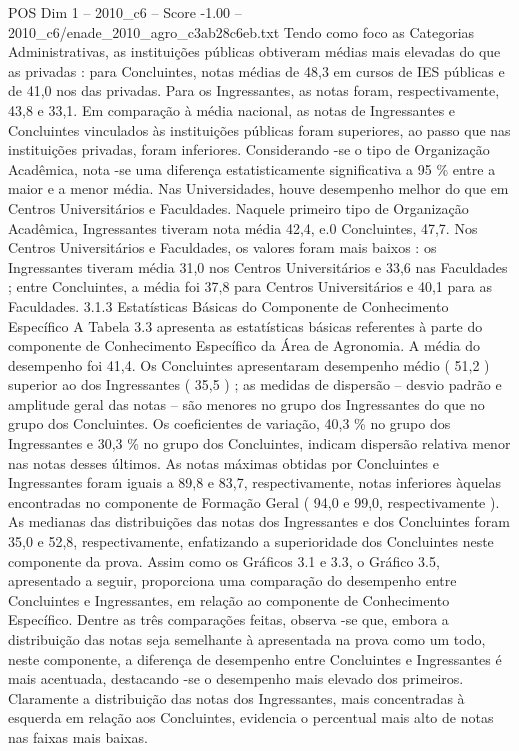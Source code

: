 \begin{textsample}{POS Dim 1 – 2010\_c6 – Score -1.00 – 2010\_c6/enade\_2010\_agro\_c3ab28c6eb.txt}
Tendo como foco as Categorias Administrativas, as instituições públicas obtiveram médias mais elevadas do que as privadas : para Concluintes, notas médias de 48,3 em cursos de IES públicas e de 41,0 nos das privadas.
Para os Ingressantes, as notas foram, respectivamente, 43,8 e 33,1.
Em comparação à média nacional, as notas de Ingressantes e Concluintes vinculados às instituições públicas foram superiores, ao passo que nas instituições privadas, foram inferiores.
Considerando -se o tipo de Organização Acadêmica, nota -se uma diferença estatisticamente significativa a 95 \% entre a maior e a menor média.
Nas Universidades, houve desempenho melhor do que em Centros Universitários e Faculdades.
Naquele primeiro tipo de Organização Acadêmica, Ingressantes tiveram nota média 42,4, e.0 Concluintes, 47,7.
Nos Centros Universitários e Faculdades, os valores foram mais baixos : os Ingressantes tiveram média 31,0 nos Centros Universitários e 33,6 nas Faculdades ; entre Concluintes, a média foi 37,8 para Centros Universitários e 40,1 para as Faculdades. 3.1.3 Estatísticas Básicas do Componente de Conhecimento Específico A Tabela 3.3 apresenta as estatísticas básicas referentes à parte do componente de Conhecimento Específico da Área de Agronomia.
A média do desempenho foi 41,4.
Os Concluintes apresentaram desempenho médio ( 51,2 ) superior ao dos Ingressantes ( 35,5 ) ; as medidas de dispersão – desvio padrão e amplitude geral das notas – são menores no grupo dos Ingressantes do que no grupo dos Concluintes.
Os coeficientes de variação, 40,3 \% no grupo dos Ingressantes e 30,3 \% no grupo dos Concluintes, indicam dispersão relativa menor nas notas desses últimos.
As notas máximas obtidas por Concluintes e Ingressantes foram iguais a 89,8 e 83,7, respectivamente, notas inferiores àquelas encontradas no componente de Formação Geral ( 94,0 e 99,0, respectivamente ).
As medianas das distribuições das notas dos Ingressantes e dos Concluintes foram 35,0 e 52,8, respectivamente, enfatizando a superioridade dos Concluintes neste componente da prova.
Assim como os Gráficos 3.1 e 3.3, o Gráfico 3.5, apresentado a seguir, proporciona uma comparação do desempenho entre Concluintes e Ingressantes, em relação ao componente de Conhecimento Específico.
Dentre as três comparações feitas, observa -se que, embora a distribuição das notas seja semelhante à apresentada na prova como um todo, neste componente, a diferença de desempenho entre Concluintes e Ingressantes é mais acentuada, destacando -se o desempenho mais elevado dos primeiros.
Claramente a distribuição das notas dos Ingressantes, mais concentradas à esquerda em relação aos Concluintes, evidencia o percentual mais alto de notas nas faixas mais baixas.

\end{textsample}
